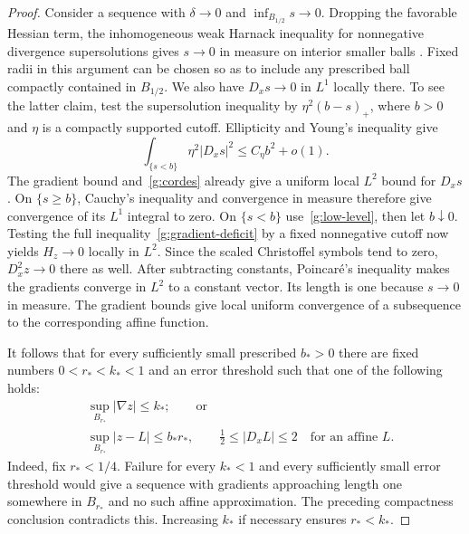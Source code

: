 \begin{proof}
Consider a sequence with $\delta\to0$ and
$\inf_{B_{1/2}}s\to0$.  Dropping the favorable Hessian term,
the inhomogeneous weak Harnack inequality for nonnegative divergence
supersolutions gives $s\to0$ in measure on interior smaller balls
\cite{GilbargTrudinger2001}.  Fixed radii in this argument can be chosen
so as to include any prescribed ball compactly contained in $B_{1/2}$.
We also have $D_xs\to0$ in $L^1$ locally there.  To see the latter claim,
test the supersolution inequality by $\eta^2(b-s)_+$, where $b>0$ and
$\eta$ is a compactly supported cutoff.  Ellipticity and Young's
inequality give
\begin{equation}\label{g:low-level}
 \int_{\{s<b\}}\eta^2|D_xs|^2
                  \leq C_\eta b^2+o(1).
\end{equation}
The gradient bound and~\eqref{g:cordes} already give a uniform local
$L^2$ bound for $D_xs$.  On $\{s\geq b\}$, Cauchy's inequality and
convergence in measure therefore give convergence of its $L^1$ integral
to zero.  On $\{s<b\}$ use~\eqref{g:low-level}, then let $b\downarrow0$.
Testing the full inequality~\eqref{g:gradient-deficit} by a fixed
nonnegative cutoff now yields $H_z\to0$ locally in $L^2$.  Since the
scaled Christoffel symbols tend to zero, $D_x^2z\to0$ there as well.
After subtracting constants, Poincar\'e's inequality makes the gradients
converge in $L^2$ to a constant vector.  Its length is one because
$s\to0$ in measure.  The gradient bounds give local uniform convergence
of a subsequence to the corresponding affine function.

It follows that for every sufficiently small prescribed $b_*>0$ there
are fixed numbers $0<r_*<k_*<1$ and an error threshold such that one of
the following holds:
\begin{equation}\label{g:drop-or-flat}
 \begin{split}
 &\sup_{B_{r_*}}|\nabla z|\leq k_*;\qquad\text{or}\\
 &\sup_{B_{r_*}}|z-L|\leq b_*r_*,\qquad
                  \tfrac12\leq|D_xL|\leq2
                  \quad\text{for an affine }L.
 \end{split}
\end{equation}
Indeed, fix $r_*<1/4$.  Failure for every $k_*<1$ and every sufficiently
small error threshold would give a sequence with gradients approaching
length one somewhere in $B_{r_*}$ and no such affine approximation.
The preceding compactness conclusion contradicts this.  Increasing
$k_*$ if necessary ensures $r_*<k_*$.


\end{proof}
